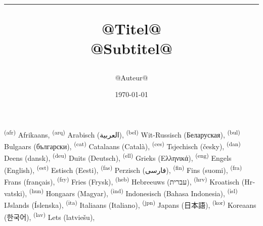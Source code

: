 \documentclass[onecolumn,a4paper,10pt]{report}
\begin{document}
\raggedbottom
\title{\color{kleur}\bfseries\Huge \begin{shaded*} \hrule @Titel@ %
\\[1ex] \large @Subtitel@ %
\end{shaded*}}
\author{\color{kleur}@Auteur@}
\vfill
\date{\color{kleur}\today{}}

\maketitle

\setcounter{page}{1}

\tableofcontents
\newpage
\setcounter{page}{1}
\textsuperscript{(afr)}  Afrikaans,
\textsuperscript{(arq)} Arabisch (\foreignlanguage{arabic}{العربية}),
\textsuperscript{(bel)}  Wit-Russisch (\foreignlanguage{belarusian}{Беларуская}),
\textsuperscript{(bul)}  Bulgaars (\foreignlanguage{bulgarian}{български}),
\textsuperscript{(cat)} Catalaans (\foreignlanguage{catalan}{Català}),
\textsuperscript{(ces)}  Tsjechisch (\foreignlanguage{czech}{česky}),
\textsuperscript{(dan)}  Deens (\foreignlanguage{danish}{dansk}),
\textsuperscript{(deu)}  Duits (\foreignlanguage{german}{Deutsch}),
\textsuperscript{(ell)}  Grieks (\foreignlanguage{greek}{Ελληνικά}),
\textsuperscript{(eng)}  Engels (\foreignlanguage{english}{English}),
\textsuperscript{(est)}  Estisch (\foreignlanguage{estonian}{Eesti}),
\textsuperscript{(fas)}  Perzisch (\foreignlanguage{persian}{فارسی}),
\textsuperscript{(fin)}  Fins (\foreignlanguage{finnish}{suomi}),
\textsuperscript{(fra)}  Frans (\foreignlanguage{french}{français}),
\textsuperscript{(fry)} Fries (Frysk),
\textsuperscript{(heb)}  Hebreeuws (\foreignlanguage{hebrew}{עברית}),
\textsuperscript{(hrv)}  Kroatisch (\foreignlanguage{croatian}{Hrvatski}),
\textsuperscript{(hun)}  Hongaars (\foreignlanguage{hungarian}{Magyar}),
\textsuperscript{(ind)}  Indonesisch (\foreignlanguage{malay}{Bahasa Indonesia}),
\textsuperscript{(isl)}  IJslands (\foreignlanguage{icelandic}{Íslenska}),
\textsuperscript{(ita)}  Italiaans (\foreignlanguage{italian}{Italiano}),
\textsuperscript{(jpn)}  Japans (\foreignlanguage{japanese}{日本語}),
\textsuperscript{(kor)}  Koreaans (\foreignlanguage{korean}{한국어}),
\textsuperscript{(lav)}  Lets (\foreignlanguage{latvian}{latviešu}),
\end{document}
